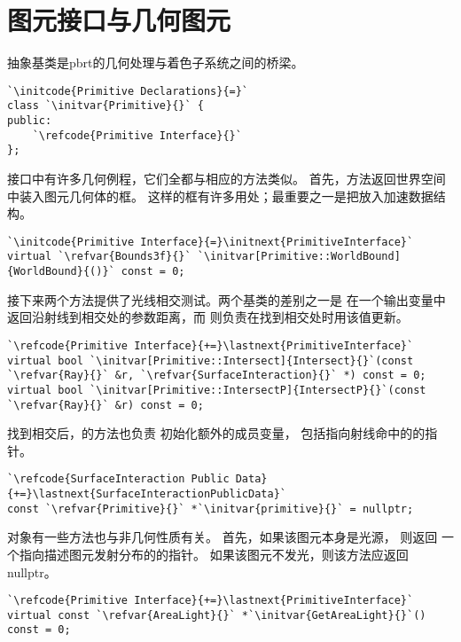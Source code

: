 \section{图元接口与几何图元}\label{sec:图元接口与几何图元}

抽象基类是pbrt的几何处理与着色子系统之间的桥梁。
\begin{lstlisting}
`\initcode{Primitive Declarations}{=}`
class `\initvar{Primitive}{}` {
public:
    `\refcode{Primitive Interface}{}`
};
\end{lstlisting}

接口中有许多几何例程，它们全都与相应的方法类似。
首先，方法返回世界空间中装入图元几何体的框。
这样的框有许多用处；最重要之一是把放入加速数据结构。
\begin{lstlisting}
`\initcode{Primitive Interface}{=}\initnext{PrimitiveInterface}`
virtual `\refvar{Bounds3f}{}` `\initvar[Primitive::WorldBound]{WorldBound}{()}` const = 0;
\end{lstlisting}

接下来两个方法提供了光线相交测试。两个基类的差别之一是\linebreak
{}在一个输出变量中
返回沿射线到相交处的参数距离，而
则负责在找到相交处时用该值更新。
\begin{lstlisting}
`\refcode{Primitive Interface}{+=}\lastnext{PrimitiveInterface}`
virtual bool `\initvar[Primitive::Intersect]{Intersect}{}`(const `\refvar{Ray}{}` &r, `\refvar{SurfaceInteraction}{}` *) const = 0;
virtual bool `\initvar[Primitive::IntersectP]{IntersectP}{}`(const `\refvar{Ray}{}` &r) const = 0;
\end{lstlisting}

找到相交后，的方法也负责
初始化额外的\linebreak{}成员变量，
包括指向射线命中的的指针。
\begin{lstlisting}
`\refcode{SurfaceInteraction Public Data}{+=}\lastnext{SurfaceInteractionPublicData}`
const `\refvar{Primitive}{}` *`\initvar{primitive}{}` = nullptr;
\end{lstlisting}

对象有一些方法也与非几何性质有关。
首先，如果该图元本身是光源，
则返回
一个指向描述图元发射分布的的指针。
如果该图元不发光，则该方法应返回{\ttfamily nullptr}。
\begin{lstlisting}
`\refcode{Primitive Interface}{+=}\lastnext{PrimitiveInterface}`
virtual const `\refvar{AreaLight}{}` *`\initvar{GetAreaLight}{}`() const = 0;
\end{lstlisting}

